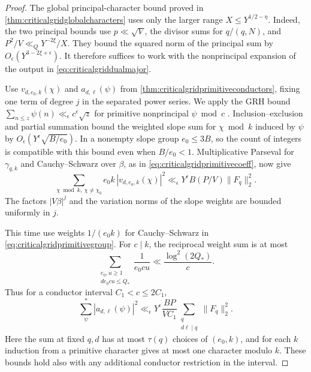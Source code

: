 \documentclass[11pt,a4paper]{article}
\numberwithin{equation}{section}
\begin{document}
\begin{proof}
The global principal-character bound proved in
\cref{thm:criticalgridglobalcharacters} uses only the larger
range $X\le Y^{1/2-\eta}$. Indeed, the two principal bounds
use $p\ll\sqrt V$, the divisor sums for $q/(q,N)$, and
$P^2/V\ll_Q Y^{-2\xi}/X$. They bound the squared norm of
the principal sum by $O_\epsilon(Y^{3-2\xi+\epsilon})$.
It therefore suffices to work with the nonprincipal expansion
of the output in \cref{eq:criticalgriddualmajor}.

Use $v_{d,e_0,k}(\chi)$ and $a_{d,\ell}(\psi)$ from
\cref{thm:criticalgridprimitiveconductors}, fixing one term
of degree $j$ in the separated power series. We apply the GRH
bound $\sum_{n\le z}\psi(n)\ll_\epsilon c^\epsilon\sqrt z$
for primitive nonprincipal $\psi\bmod c$
\cite[Section~1]{GoldmakherMimicry}. Inclusion--exclusion and
partial summation bound the weighted slope sum for
$\chi\bmod k$ induced by $\psi$ by
$O_\epsilon(Y^\epsilon\sqrt{B/e_0})$.
In a nonempty slope group $e_0\le3B$, so the count of
integers is compatible with this bound even when $B/e_0<1$.
Multiplicative Parseval for $\gamma_{q,k}$ and
Cauchy--Schwarz over $\beta$, as in
\cref{eq:criticalgridprimitivecoeff}, now give
\begin{equation}
 \sum_{\chi\bmod k,\ \chi\ne\chi_0} e_0 k\,|v_{d,e_0,k}(\chi)|^2
 \ll_\epsilon Y^\epsilon B(P/V)\|F_q\|_2^2 .
 \label{eq:criticalgridcommoncoeff}
\end{equation}
The factors $|V\beta|^j$ and the variation norms of the slope
weights are bounded uniformly in $j$.

This time use weights $1/(e_0k)$ for Cauchy--Schwarz
in \cref{eq:criticalgridprimitivegroup}. For $c\mid k$,
the reciprocal weight sum is at most
\[
 \sum_{\substack{e_0,u\ge1\\ d e_0 c u\le Q_*}}
                          \frac{1}{e_0 c u}
       \ll \frac{\log^2(2Q_*)}{c}.
\]
Thus for a conductor interval $C_1<c\le2C_1$,
\begin{equation}
 \sum_\psi^* |a_{d,\ell}(\psi)|^2
     \ll_\epsilon Y^\epsilon\frac{B P}{V C_1}
                \sum_{\substack{q\\d\ell\mid q}}\|F_q\|_2^2.
 \label{eq:criticalgridcommoncompressed}
\end{equation}
Here the sum at fixed $q,d$ has at most $\tau(q)$ choices
of $(e_0,k)$, and for each $k$ induction from a primitive
character gives at most one character modulo $k$.
These bounds hold also with any additional conductor
restriction in the interval.


\end{proof}
\end{document}

